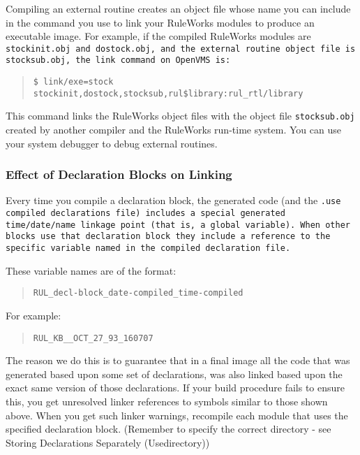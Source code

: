 Compiling an external routine creates an object file
whose name you can include in the command you use to link
your RuleWorks modules to produce an executable image.
For example, if the compiled RuleWorks modules are
\tt{stockinit.obj} and \tt{dostock.obj}, and the external routine
object file is \tt{stocksub.obj}, the link command on OpenVMS
is:

\begin{quote}
\begin{verbatim}
$ link/exe=stock stockinit,dostock,stocksub,rul$library:rul_rtl/library
\end{verbatim}
\end{quote}  

This command links the RuleWorks object files with the object file
\verb|stocksub.obj| created by another compiler and the RuleWorks
run-time system. You can use your system debugger to debug external
routines.

\subsubsection{Effect of Declaration Blocks on Linking}

Every time you compile a declaration block, the generated code (and
the \tt{.use} compiled declarations file) includes a special generated
time/date/name linkage point (that is, a global variable). When other
blocks use that declaration block they include a reference to the
specific variable named in the compiled declaration file.

These variable names are of the format:

\begin{quote}
\begin{verbatim}
RUL_decl-block_date-compiled_time-compiled
\end{verbatim}
\end{quote}

For example:

\begin{quote}
\begin{verbatim}
RUL_KB__OCT_27_93_160707
\end{verbatim}
\end{quote}  

The reason we do this is to guarantee that in a final image all the
code that was generated based upon some set of declarations, was also
linked based upon the exact same version of those declarations. If
your build procedure fails to ensure this, you get unresolved linker
references to symbols similar to those shown above. When you get such
linker warnings, recompile each module that uses the specified
declaration block. (Remember to specify the correct directory - see
Storing Declarations Separately (Usedirectory))

